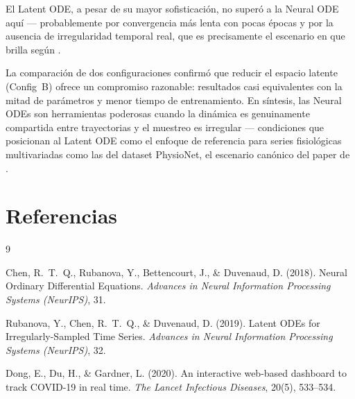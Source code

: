 \documentclass[12pt,a4paper]{article}
\begin{document}
El Latent ODE, a pesar de su mayor sofisticación, no superó a la Neural ODE
aquí --- probablemente por convergencia más lenta con pocas épocas y por la
ausencia de irregularidad temporal real, que es precisamente el escenario en
que brilla según \citet{rubanova2019}.

La comparación de dos configuraciones confirmó que reducir el espacio latente
(Config~B) ofrece un compromiso razonable: resultados casi equivalentes con la
mitad de parámetros y menor tiempo de entrenamiento.
En síntesis, las Neural ODEs son herramientas poderosas cuando la dinámica es
genuinamente compartida entre trayectorias y el muestreo es irregular ---
condiciones que posicionan al Latent ODE como el enfoque de referencia para
series fisiológicas multivariadas como las del dataset PhysioNet, el escenario
canónico del paper de \citet{rubanova2019}.

\section*{Referencias}

\begin{thebibliography}{9}

  Chen, R.~T.~Q., Rubanova, Y., Bettencourt, J., \& Duvenaud, D. (2018).
  Neural Ordinary Differential Equations.
  \textit{Advances in Neural Information Processing Systems (NeurIPS)}, 31.

  Rubanova, Y., Chen, R.~T.~Q., \& Duvenaud, D. (2019).
  Latent ODEs for Irregularly-Sampled Time Series.
  \textit{Advances in Neural Information Processing Systems (NeurIPS)}, 32.

  Dong, E., Du, H., \& Gardner, L. (2020).
  An interactive web-based dashboard to track COVID-19 in real time.
  \textit{The Lancet Infectious Diseases}, 20(5), 533--534.

\end{thebibliography}
\end{document}
